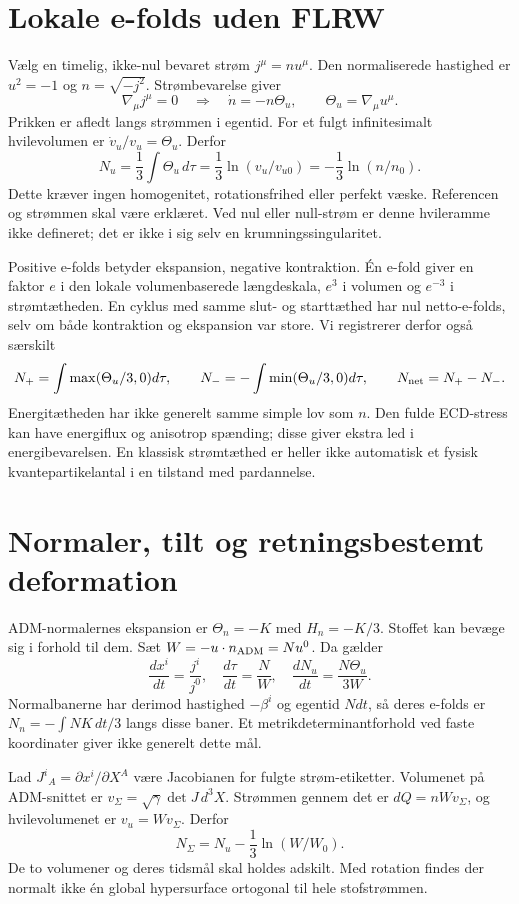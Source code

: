 \documentclass[11pt,a4paper]{article}
\begin{document}
\section{Lokale e-folds uden FLRW}
Vælg en timelig, ikke-nul bevaret strøm $j^\mu=n u^\mu$. Den normaliserede hastighed er $u^2=-1$ og $n=\sqrt{-j^2}$. Strømbevarelse giver
\[
 \nabla_\mu j^\mu=0\quad\Longrightarrow\quad \dot n=-n\Theta_u,
 \qquad\Theta_u=\nabla_\mu u^\mu.
\]
Prikken er afledt langs strømmen i egentid. For et fulgt infinitesimalt hvilevolumen er $\dot v_u/v_u=\Theta_u$. Derfor
\[
 \boxed{N_u=\frac13\int\Theta_u\,d\tau
 =\frac13\ln(v_u/v_{u0})=-\frac13\ln(n/n_0).}
\]
Dette kræver ingen homogenitet, rotationsfrihed eller perfekt væske. Referencen og strømmen skal være erklæret. Ved nul eller null-strøm er denne hvileramme ikke defineret; det er ikke i sig selv en krumningssingularitet.

Positive e-folds betyder ekspansion, negative kontraktion. Én e-fold giver en faktor $e$ i den lokale volumenbaserede længdeskala, $e^3$ i volumen og $e^{-3}$ i strømtætheden. En cyklus med samme slut- og starttæthed har nul netto-e-folds, selv om både kontraktion og ekspansion var store. Vi registrerer derfor også særskilt
\[
 N_+=\int\max(\Theta_u/3,0)d\tau,\qquad
 N_-=-\int\min(\Theta_u/3,0)d\tau,
 \qquad N_{\rm net}=N_+-N_-.
\]
Energitætheden har ikke generelt samme simple lov som $n$. Den fulde ECD-stress kan have energiflux og anisotrop spænding; disse giver ekstra led i energibevarelsen. En klassisk strømtæthed er heller ikke automatisk et fysisk kvantepartikelantal i en tilstand med pardannelse.

\section{Normaler, tilt og retningsbestemt deformation}
ADM-normalernes ekspansion er $\Theta_n=-K$ med $H_n=-K/3$. Stoffet kan bevæge sig i forhold til dem. Sæt $W=-u\cdot n_{\rm ADM}=Nu^0$. Da gælder
\[
 \frac{dx^i}{dt}=\frac{j^i}{j^0},\quad
 \frac{d\tau}{dt}=\frac N W,\quad
 \frac{dN_u}{dt}=\frac{N\Theta_u}{3W}.
\]
Normalbanerne har derimod hastighed $-\beta^i$ og egentid $Ndt$, så deres e-folds er $N_n=-\int NK\,dt/3$ langs disse baner. Et metrikdeterminantforhold ved faste koordinater giver ikke generelt dette mål.

Lad $J^i{}_A=\partial x^i/\partial X^A$ være Jacobianen for fulgte strøm-etiketter. Volumenet på ADM-snittet er $v_\Sigma=\sqrt\gamma\det J\,d^3X$. Strømmen gennem det er $dQ=nWv_\Sigma$, og hvilevolumenet er $v_u=Wv_\Sigma$. Derfor
\[
 \boxed{N_\Sigma=N_u-\frac13\ln(W/W_0).}
\]
De to volumener og deres tidsmål skal holdes adskilt. Med rotation findes der normalt ikke én global hypersurface ortogonal til hele stofstrømmen.
\end{document}
